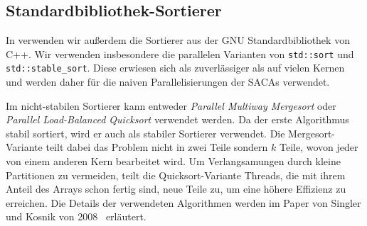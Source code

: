 \subsection{Standardbibliothek-Sortierer}
\label{section:stdsort}

In \sacabench verwenden wir außerdem die Sortierer aus der GNU Standardbibliothek von C++.
Wir verwenden insbesondere die parallelen Varianten von \texttt{std::sort}
und \texttt{std::stable\_sort}.
Diese erwiesen sich als zuverlässiger als \ipsviero auf vielen Kernen
und werden daher für die naiven Parallelisierungen der SACAs verwendet.

Im nicht-stabilen Sortierer kann entweder \emph{Parallel Multiway Mergesort} oder \emph{Parallel Load-Balanced Quicksort} verwendet werden.
Da der erste Algorithmus stabil sortiert, wird er auch als stabiler Sortierer verwendet.
Die Mergesort-Variante teilt dabei das Problem nicht in zwei Teile sondern $k$ Teile, wovon jeder von einem anderen Kern bearbeitet wird.
Um Verlangsamungen durch kleine Partitionen zu vermeiden, teilt die Quicksort-Variante Threads,
die mit ihrem Anteil des Arrays schon fertig sind, neue Teile zu, um eine höhere Effizienz zu erreichen.
Die Details der verwendeten Algorithmen werden im Paper von Singler und Kosnik von 2008~\cite{parallelstdsort} erläutert.